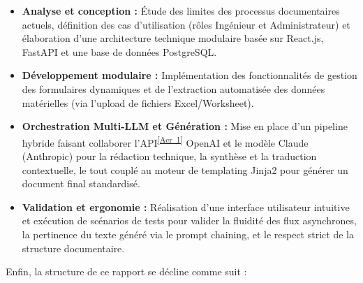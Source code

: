 \documentclass[12pt, a4paper]{report}
\newcommand{\acref}[1]{\textsuperscript{\hyperlink{acr:#1}{[Acr~#1]}}}
\begin{document}
\begin{itemize}
    \item \textbf{Analyse et conception :} Étude des limites des processus documentaires actuels, définition des cas d'utilisation (rôles Ingénieur et Administrateur) et élaboration d’une architecture technique modulaire basée sur React.js, FastAPI et une base de données PostgreSQL.
    
    \item \textbf{Développement modulaire :} Implémentation des fonctionnalités de gestion des formulaires dynamiques et de l'extraction automatisée des données matérielles (via l'upload de fichiers Excel/Worksheet).
    
    \item \textbf{Orchestration Multi-LLM et Génération :} Mise en place d'un pipeline hybride faisant collaborer l'API\acref{1} OpenAI et le modèle Claude (Anthropic) pour la rédaction technique, la synthèse et la traduction contextuelle, le tout couplé au moteur de templating Jinja2 pour générer un document final standardisé.
    
    \item \textbf{Validation et ergonomie :} Réalisation d'une interface utilisateur intuitive et exécution de scénarios de tests pour valider la fluidité des flux asynchrones, la pertinence du texte généré via le prompt chaining, et le respect strict de la structure documentaire.
\end{itemize}

Enfin, la structure de ce rapport se décline comme suit :
\end{document}
